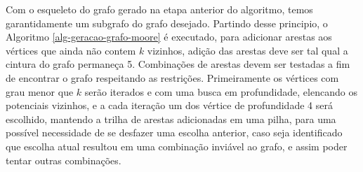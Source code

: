 Com o esqueleto do grafo gerado na etapa anterior do algoritmo, temos garantidamente um subgrafo do grafo desejado. Partindo desse principio, o Algoritmo \ref{alg-geracao-grafo-moore} é executado, para adicionar arestas aos vértices que ainda não contem $k$ vizinhos, adição das arestas deve ser tal qual a cintura do grafo permaneça 5. Combinações de arestas devem ser testadas a fim de encontrar o grafo respeitando as restrições. Primeiramente os vértices com grau menor que $k$ serão iterados e com uma busca em profundidade, elencando os potenciais vizinhos, 
e a cada iteração um dos vértice de profundidade 4 será escolhido, mantendo a trilha de arestas adicionadas em uma pilha, para uma possível necessidade de se desfazer uma escolha anterior, caso seja identificado que escolha atual resultou em uma combinação inviável ao grafo, e assim poder tentar outras combinações.


